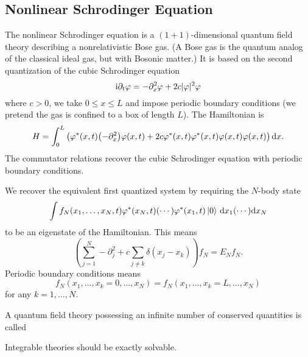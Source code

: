 \subsection{Nonlinear Schrodinger Equation}
\M
The nonlinear Schrodinger equation is a $(1+1)$-dimensional quantum
field theory describing a nonrelativistic Bose gas. (A Bose gas is the
quantum analog of the classical ideal gas, but with Bosonic matter.) It
is based on the second quantization of the cubic Schrodinger equation
\begin{equation}
{\rm i}\partial_{t}\varphi = -\partial_{x}^{2}\varphi + 2c|\varphi|^{2}\varphi
\end{equation}
where $c>0$, we take $0\leq x\leq L$ and impose periodic boundary
conditions (we pretend the gas is confined to a box of length $L$). The
Hamiltonian is 
\begin{equation}
H = \int^{L}_{0}\left(\varphi^{*}(x,t)\bigl(-\partial_{x}^{2}\bigr)\varphi(x,t)+2c\varphi^{*}(x,t)\varphi^{*}(x,t)\varphi(x,t)\varphi(x,t)\right)\mathrm{d}{x}.
\end{equation}
The commutator relations recover the cubic Schrodinger equation with
periodic boundary conditions.

We recover the equivalent first quantized system by requiring the
$N$-body state
\begin{equation*}
\int f_{N}(x_{1},\dots,x_{N},t)\varphi^{*}(x_{N},t)(\cdots)\varphi^{*}(x_{1},t)\ket{0}\,\mathrm{d}{x_{1}}(\cdots)\mathrm{d}{x_{N}}
\end{equation*}
to be an eigenstate of the Hamiltonian. This means
\begin{equation}
\left(\sum^{N}_{j=1}-\partial_{j}^{2}+c\sum_{j\neq k}\delta(x_{j}-x_{k})\right)f_{N}
= E_{N}f_{N}.
\end{equation}
Periodic boundary conditions means
\begin{equation}
 f_{N}(x_{1},\dots,x_{k}=0,\dots,x_{N})
=f_{N}(x_{1},\dots,x_{k}=L,\dots,x_{N})
\end{equation}
for any $k=1,\dots,N$.

\begin{defn}
A quantum field theory possessing an infinite number of
conserved quantities is called 
\end{defn}

\begin{thm}
Integrable theories should be exactly solvable.
\end{thm}

